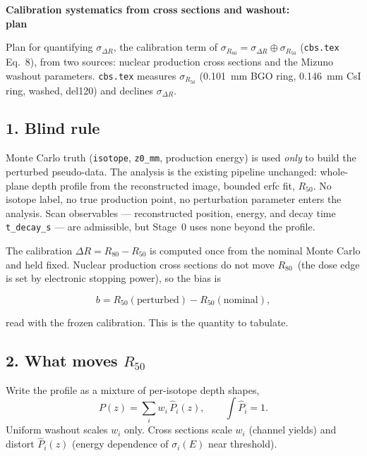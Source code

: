 \documentclass[11pt]{article}
\newcommand{\Rc}{\ensuremath{R_{50}}}
\newcommand{\Roc}{\ensuremath{R_{80}}}
\begin{document}
\begin{center}
  {\large\textbf{Calibration systematics from cross sections and washout:}}\\[2pt]
  {\large\textbf{plan}}
\end{center}
\medskip

\noindent
Plan for quantifying $\sigma_{\Delta R}$, the calibration term of
$\sigma_{\Roc} = \sigma_{\Delta R} \oplus \sigma_{\Rc}$ (\texttt{cbs.tex}
Eq.~8), from two sources: nuclear production cross sections and the Mizuno
washout parameters. \texttt{cbs.tex} measures $\sigma_{\Rc}$ (0.101~mm BGO ring,
0.146~mm CsI ring, washed, del120) and declines $\sigma_{\Delta R}$.

\subsection*{1. Blind rule}

Monte Carlo truth (\texttt{isotope}, \texttt{z0\_mm}, production energy) is used
\emph{only} to build the perturbed pseudo-data. The analysis is the existing
pipeline unchanged: whole-plane depth profile from the reconstructed image,
bounded erfc fit, \Rc. No isotope label, no true production point, no
perturbation parameter enters the analysis. Scan observables --- reconstructed
position, energy, and decay time \texttt{t\_decay\_s} --- are admissible, but
Stage~0 uses none beyond the profile.

The calibration $\Delta R = \Roc - \Rc$ is computed once from the nominal Monte
Carlo and held fixed. Nuclear production cross sections do not move \Roc\ (the
dose edge is set by electronic stopping power), so the bias is

\begin{equation}
  b = \Rc(\text{perturbed}) - \Rc(\text{nominal}),
\end{equation}

read with the frozen calibration. This is the quantity to tabulate.

\subsection*{2. What moves \Rc}

Write the profile as a mixture of per-isotope depth shapes,
\begin{equation}
  P(z) = \sum_i w_i\,\hat P_i(z),
  \qquad \textstyle\int \hat P_i = 1 .
\end{equation}
Uniform washout scales $w_i$ only. Cross sections scale $w_i$ (channel yields)
and distort $\hat P_i(z)$ (energy dependence of $\sigma_i(E)$ near threshold).
\end{document}
